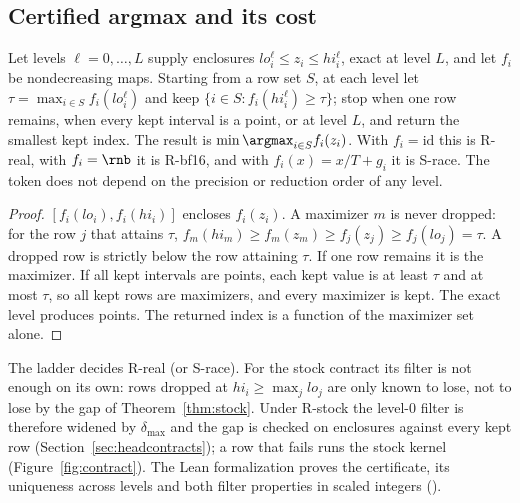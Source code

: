 \subsection{Certified argmax and its cost}\label{sec:ladder}
\begin{theorem}\label{thm:ladder}
Let levels $\ell=0,\dots,L$ supply enclosures $lo^\ell_i\le z_i\le hi^\ell_i$, exact at level $L$, and let $f_i$ be nondecreasing maps. Starting from a row set $S$, at each level let $\tau=\max_{i\in S}f_i(lo^\ell_i)$ and keep $\{i\in S:f_i(hi^\ell_i)\ge\tau\}$; stop when one row remains, when every kept interval is a point, or at level $L$, and return the smallest kept index. The result is $\min\argmax_{i\in S}f_i(z_i)$. With $f_i=\mathrm{id}$ this is R-real, with $f_i=\rnb$ it is R-bf16, and with $f_i(x)=x/T+g_i$ it is S-race. The token does not depend on the precision or reduction order of any level.
\end{theorem}
\begin{proof}
$[f_i(lo_i),f_i(hi_i)]$ encloses $f_i(z_i)$. A maximizer $m$ is never dropped: for the row $j$ that attains $\tau$, $f_m(hi_m)\ge f_m(z_m)\ge f_j(z_j)\ge f_j(lo_j)=\tau$. A dropped row is strictly below the row attaining $\tau$. If one row remains it is the maximizer. If all kept intervals are points, each kept value is at least $\tau$ and at most $\tau$, so all kept rows are maximizers, and every maximizer is kept. The exact level produces points. The returned index is a function of the maximizer set alone.
\end{proof}
The ladder decides R-real (or S-race). For the stock contract its filter is not enough on its own: rows dropped at $hi_i\ge\max_jlo_j$ are only known to lose, not to lose by the gap of Theorem~\ref{thm:stock}. Under R-stock the level-0 filter is therefore widened by $\delta_{\max}$ and the gap is checked on enclosures against every kept row (Section~\ref{sec:headcontracts}); a row that fails runs the stock kernel (Figure~\ref{fig:contract}). The Lean formalization proves the certificate, its uniqueness across levels and both filter properties in scaled integers ().

